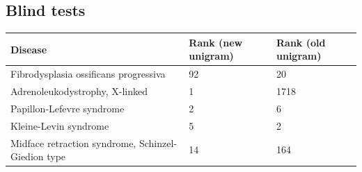 \documentclass[10pt,letterpaper,final]{article}
\begin{document}
\subsection{Blind tests}
\label{app:blind_old_new}
\begin{center}
\begin{small}
	\begin{tabular}{|p{6cm}|p{2.5cm}|p{2.5cm}|}
	\hline
	\textbf{Disease} & \textbf{Rank (new unigram)} & \textbf{Rank (old unigram)} \\
    \hline\hline
    Fibrodysplasia ossificans progressiva & 92 & 20\\    \hline
    Adrenoleukodystrophy, X-linked & 1 & 1718\\    \hline
    Papillon-Lefevre syndrome & 2 & 6\\    \hline
    Kleine-Levin syndrome & 5 & 2\\    \hline
    Midface retraction syndrome, Schinzel-Giedion type  & 14 & 164\\    \hline
	\end{tabular}
\end{small}
\end{center}
\end{document}
